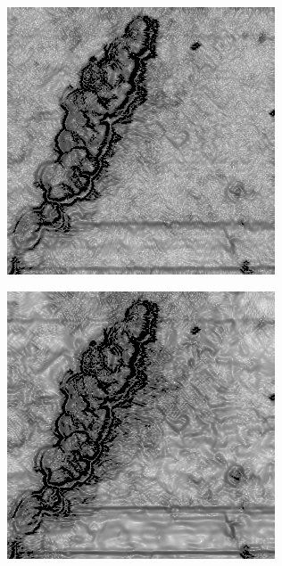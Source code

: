 \documentclass[../main.tex]{subfiles}
\begin{document}
\begin{figure}[!ht]
\begin{subfigure}{0.3\linewidth}
	\end{subfigure}
	\hfill
	\begin{subfigure}{0.3\linewidth}
		\centering
		\includegraphics[keepaspectratio, width=\linewidth]{images/nlm_grad.png}
	\end{subfigure}
	\hfill
	\begin{subfigure}{0.3\linewidth}
		\centering
		\includegraphics[keepaspectratio, width=\linewidth]{images/bm3d_grad.png}

\end{subfigure}
\end{figure}
\end{document}

